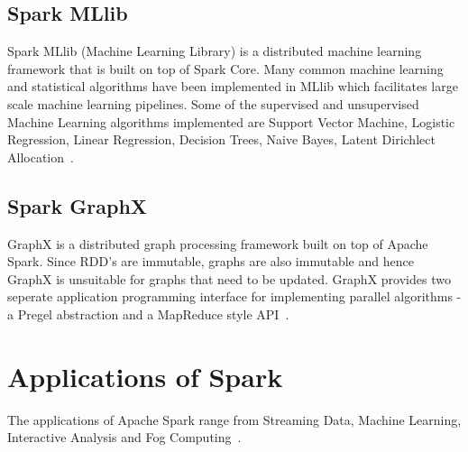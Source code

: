 \subsection{Spark MLlib}
Spark MLlib (Machine Learning Library) is a distributed machine learning 
framework that is built on top of Spark Core. Many common machine learning and 
statistical algorithms have been implemented in MLlib which facilitates large 
scale machine learning pipelines. Some of the supervised and unsupervised 
Machine Learning algorithms implemented are Support Vector Machine, Logistic 
Regression, Linear Regression, Decision Trees, Naive Bayes, Latent Dirichlect 
Allocation~\cite{hid-sp18-408-Spark}.


\subsection{Spark GraphX}
GraphX is a distributed graph processing framework built on top of Apache Spark. 
Since RDD's are immutable, graphs are also immutable and hence GraphX is 
unsuitable for graphs that need to be updated. GraphX provides two seperate 
application programming interface for implementing parallel algorithms - a 
Pregel abstraction and a MapReduce style API~\cite{hid-sp18-408-Spark}.


\section{Applications of Spark}

The applications of Apache Spark range from Streaming Data, Machine Learning, 
Interactive Analysis and Fog Computing~\cite{hid-sp18-408-fog}.


